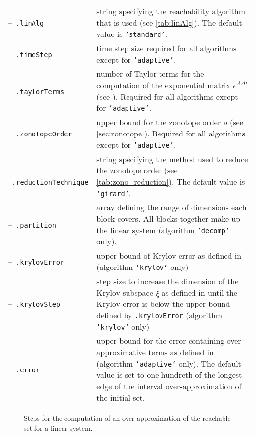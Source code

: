 \begin{center}
\renewcommand{\arraystretch}{1.3}
\begin{longtable}[t]{l p{11cm}}	
	--~\texttt{.linAlg} & string specifying the reachability algorithm that is used (see \cref{tab:linAlg}). The default value is \texttt{'standard'}. \\
	--~\texttt{.timeStep} & time step size required for all algorithms except for \texttt{'adaptive'}. \\
	--~\texttt{.taylorTerms} & number of Taylor terms for the computation of the exponential matrix $e^{A\Delta t}$ (see \cite[Eq. (3.2)]{Althoff2010a}). Required for all algorithms except for \texttt{'adaptive'}. \\
	--~\texttt{.zonotopeOrder} & upper bound for the zonotope order $\rho$ (see \cref{sec:zonotope}). Required for all algorithms except for \texttt{'adaptive'}. \\
	--~\texttt{.reductionTechnique} & string specifying the method used to reduce the zonotope order (see \cref{tab:zono_reduction}). The default value is \texttt{'girard'}. \\
	--~\texttt{.partition} & array defining the range of dimensions each block covers. All blocks together make up the linear system (algorithm \texttt{'decomp'} only). \\
	--~\texttt{.krylovError} & upper bound of Krylov error as defined in \cite[eq.~(3)]{Althoff2020c} (algorithm \texttt{'krylov'} only) \\
	--~\texttt{.krylovStep} & step size to increase the dimension of the Krylov subspace $\xi$ as defined in \cite[Sec.~II.A]{Althoff2020c} until the Krylov error is below the upper bound defined by \texttt{.krylovError} (algorithm \texttt{'krylov'} only) \\
	--~\texttt{.error} & upper bound for the error containing over-approximative terms as defined in \cite{Wetzlinger2020} (algorithm \texttt{'adaptive'} only). The default value is set to one hundreth of the longest edge of the interval over-approximation of the initial set.
\end{longtable}
\end{center}

\begin{figure}[htb]
    \centering	
	\footnotesize
    \caption{Steps for the computation of an over-approximation of the reachable set for a linear system.}
    \label{fig:linReachOverview}
\end{figure}

